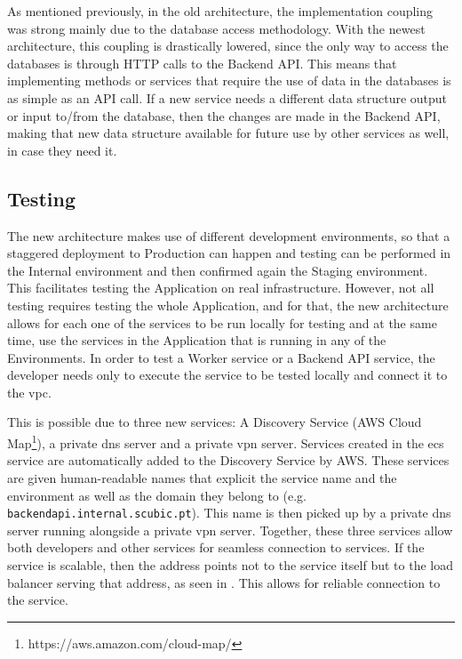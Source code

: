 As mentioned previously, in the old architecture, the implementation coupling was strong mainly due to the database access methodology. With the newest architecture, this coupling is drastically lowered, since the only way to access the databases is through HTTP calls to the Backend API. This means that implementing methods or services that require the use of data in the databases is as simple as an API call. If a new service needs a different data structure output or input to/from the database, then the changes are made in the Backend API, making that new data structure available for future use by other services as well, in case they need it.

\subsection{Testing}\label{methodology:sss:testing-new}

The new architecture makes use of different development environments, so that a staggered deployment to Production can happen and testing can be performed in the Internal environment and then confirmed again the Staging environment. This facilitates testing the Application on real infrastructure. However, not all testing requires testing the whole Application, and for that, the new architecture allows for each one of the services to be run locally for testing and at the same time, use the services in the Application that is running in any of the Environments. In order to test a Worker service or a Backend API service, the developer needs only to execute the service to be tested locally and connect it to the \gls{vpc}.



This is possible due to three new services: A Discovery Service (AWS Cloud Map\footnote{https://aws.amazon.com/cloud-map/\label{foot:cloudmap}}), a private \gls{dns} server and a private \gls{vpn} server.
Services created in the \gls{ecs} service are automatically added to the Discovery Service by AWS. These services are given human-readable names that explicit the service name and the environment as well as the domain they belong to (e.g. \texttt{backendapi.internal.scubic.pt}). This name is then picked up by a private \gls{dns} server running alongside a private \gls{vpn} server. Together, these three services allow both developers and other services for seamless connection to services. If the service is scalable, then the address points not to the service itself but to the load balancer serving that address, as seen in . This allows for reliable connection to the service.

